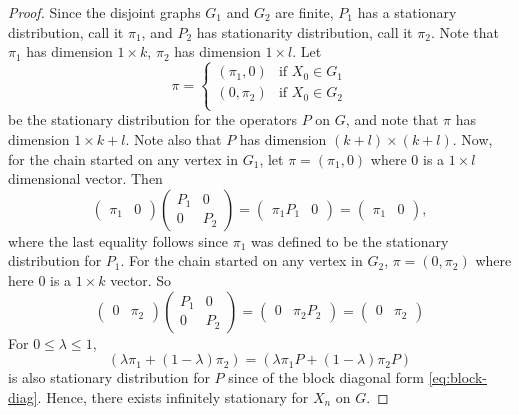 \documentclass[oneside,reqno]{amsart}
\theoremstyle{definition}
\begin{document}
\begin{enumerate}
\begin{proof}
Since the disjoint graphs $G_1$ and $G_2$ are finite, $P_1$ has a stationary distribution, call it $\pi_1$, and $P_2$ has stationarity distribution, call it $\pi_2$. Note that $\pi_1$ has dimension $1\times k$, $\pi_2$ has dimension $1 \times l$. Let 
\[
	\pi = \begin{cases}
		(\pi_1, 0) & \text{if } X_0  \in G_1 \\
		(0, \pi_2) & \text{if } X_0  \in G_2 \\ 
	\end{cases}
\] 
be the stationary distribution for the operators $P$ on $G$, and note that $\pi$ has dimension $1 \times k+l$. Note also that $P$ has dimension $(k+l) \times (k+l)$. Now, for the chain started on any vertex in $G_1$, let $\pi = (\pi_1, 0)$ where $0$ is a $1 \times l$ dimensional vector. Then 
\[
	\begin{pmatrix}
		\pi_1 & 0
	\end{pmatrix}
	\begin{pmatrix}
		P_1 & 0 \\
		0 & P_2 
	\end{pmatrix} 
	= \begin{pmatrix} 
	\pi_1 P_1 & 0 
	\end{pmatrix}
	= \begin{pmatrix}
		\pi_1& 0
	\end{pmatrix},
\] 
where the last equality follows since $\pi_1$ was defined to be the stationary distribution for $P_1$. For the chain started on any vertex in $G_2$, $\pi =  (0,\pi_2)$ where here $0$ is a $1 \times k$ vector. So
\[
	\begin{pmatrix}
		0 & \pi_2
	\end{pmatrix}
	\begin{pmatrix}
		P_1 & 0 \\
		0 & P_2 
	\end{pmatrix} 
	= \begin{pmatrix}
		0 & \pi_2 P_2
	\end{pmatrix}
	= \begin{pmatrix}
		0 & \pi_2
	\end{pmatrix}
\]
For $0 \leq \lambda \leq 1$,
\[
	( \lambda \pi_1 + (1-\lambda) \pi_2 ) = ( \lambda \pi_1 P + (1-\lambda) \pi_2 P)
\]
is also stationary distribution for $P$ since of the block diagonal form \eqref{eq:block-diag}. Hence, there exists infinitely stationary for $X_n$ on $G$. 
\end{proof}
\end{enumerate}
\end{document}
